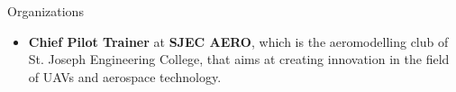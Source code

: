 \documentclass{resume} %
\begin{document}
\begin{rSection}{Organizations} 
    \begin{itemize}
        \item 	\textbf{Chief Pilot Trainer} at \textbf{SJEC AERO}, which is the aeromodelling club of St. Joseph Engineering College, that aims at creating innovation in the field of UAVs and aerospace technology.
        
        
    
    \end{itemize}
    
    
\end{rSection}



        
        
    
    
    
\end{document}
